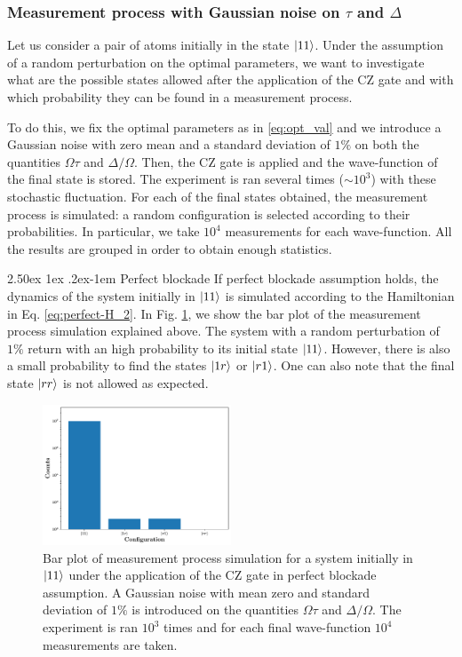 \documentclass[rmp,10pt,onecolumn,fleqn,notitlepage]{revtex4-1}
\makeatletter
\renewcommand{\paragraph}{%
    \@startsection{paragraph}{4}%
    {\z@}{2.50ex \@plus 1ex \@minus .2ex}{-1em}%
    {\bf\sffamily}%
}
\makeatother
\begin{document}
\subsubsection{Measurement process with Gaussian noise on $\tau$ and $\Delta$}

Let us consider a pair of atoms initially in the state $\left\vert{11}\right\rangle$. Under the assumption of a random perturbation on the optimal parameters, we want to investigate what are the possible states allowed after the application of the CZ gate and with which probability they can be found in a measurement process.

To do this, we fix the optimal parameters as in \eqref{eq:opt_val} and we introduce a Gaussian noise with zero mean and a standard deviation of $1\%$ on both the quantities $\Omega \tau$ and $\Delta/\Omega$. Then, the CZ gate is applied and the wave-function of the final state is stored.
The experiment is ran several times ($\sim 10^3$) with these stochastic fluctuation. 
For each of the final states obtained, the measurement process is simulated: a random configuration is selected according to their probabilities. In particular, we take $10^4$ measurements for each wave-function. All the results are grouped in order to obtain enough statistics.

\paragraph{Perfect blockade} If perfect blockade assumption holds, the dynamics of the system initially in $\left\vert{11}\right\rangle$ is simulated according to the Hamiltonian in Eq. \eqref{eq:perfect-H_2}. In Fig. \ref{fig:measurement_perfect-blockade}, we show the bar plot of the measurement process simulation explained above. The system with a random perturbation of $1\%$ return with an high probability to its initial state $\left\vert{11}\right\rangle$. However, there is also a small probability to find the states $\left\vert{1r}\right\rangle$ or $\left\vert{r1}\right\rangle$.
One can also note that the final state $\left\vert{rr}\right\rangle$ is not allowed as expected. 

\begin{figure}[H]
    \centering
    \includegraphics[width=0.5\textwidth]{image/two-qubit-system/measurement/noise_measurement_two-qubit.pdf}
    \caption{Bar plot of measurement process simulation for a system initially in $\left\vert{11}\right\rangle$ under the application of the CZ gate in perfect blockade assumption. A Gaussian noise with mean zero and standard deviation of $1\%$ is introduced on the quantities $\Omega\tau$ and $\Delta/\Omega$. The experiment is ran $10^3$ times and for each final wave-function $10^4$ measurements are taken.}
    \label{fig:measurement_perfect-blockade}
\end{figure}
\end{document}
